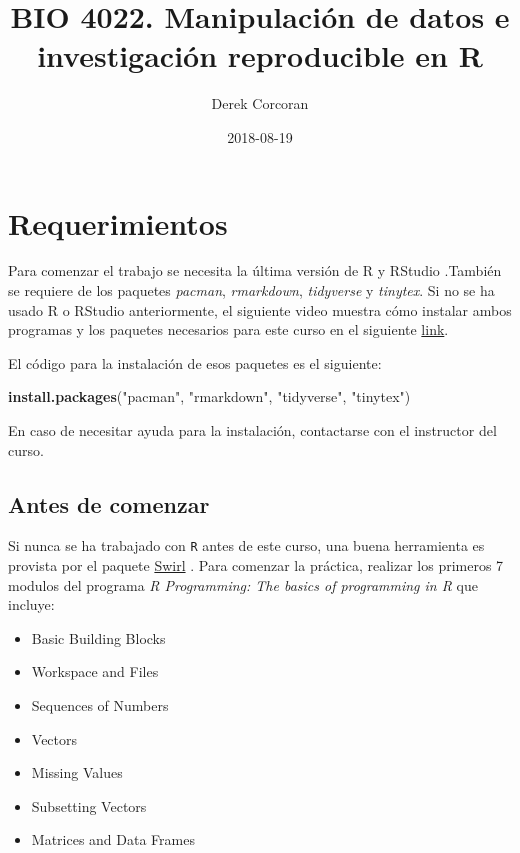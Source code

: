 \documentclass[]{book}
\title{BIO 4022. Manipulación de datos e investigación reproducible en R}
\author{Derek Corcoran}
\date{2018-08-19}
\newenvironment{Shaded}{\begin{snugshade}}{\end{snugshade}}
\newcommand{\KeywordTok}[1]{\textcolor[rgb]{0.13,0.29,0.53}{\textbf{#1}}}
\newcommand{\NormalTok}[1]{#1}
\newcommand{\StringTok}[1]{\textcolor[rgb]{0.31,0.60,0.02}{#1}}
\providecommand{\tightlist}{%
  \setlength{\itemsep}{0pt}\setlength{\parskip}{0pt}}
\begin{document}
\maketitle

{
\setcounter{tocdepth}{1}
\tableofcontents
}
\hypertarget{requerimientos}{%
\chapter*{Requerimientos}\label{requerimientos}}

Para comenzar el trabajo se necesita la última versión de R y RStudio
\citep{R-base}.También se requiere de los paquetes \emph{pacman},
\emph{rmarkdown}, \emph{tidyverse} y \emph{tinytex}. Si no se ha usado R
o RStudio anteriormente, el siguiente video muestra cómo instalar ambos
programas y los paquetes necesarios para este curso en el siguiente
\href{https://youtu.be/RtkCAKXsVbw}{link}.

El código para la instalación de esos paquetes es el siguiente:

\begin{Shaded}
\begin{Highlighting}[]
\KeywordTok{install.packages}\NormalTok{(}\StringTok{"pacman"}\NormalTok{, }\StringTok{"rmarkdown"}\NormalTok{, }\StringTok{"tidyverse"}\NormalTok{, }\StringTok{"tinytex"}\NormalTok{)}
\end{Highlighting}
\end{Shaded}

En caso de necesitar ayuda para la instalación, contactarse con el
instructor del curso.

\hypertarget{antes-de-comenzar}{%
\section{Antes de comenzar}\label{antes-de-comenzar}}

Si nunca se ha trabajado con \texttt{R} antes de este curso, una buena
herramienta es provista por el paquete
\href{http://swirlstats.com/students.html}{Swirl} \citep{Kross2017}.
Para comenzar la práctica, realizar los primeros 7 modulos del programa
\emph{R Programming: The basics of programming in R} que incluye:

\begin{itemize}
\tightlist
\item
  Basic Building Blocks
\item
  Workspace and Files
\item
  Sequences of Numbers
\item
  Vectors
\item
  Missing Values
\item
  Subsetting Vectors
\item
  Matrices and Data Frames
\end{itemize}
\end{document}
